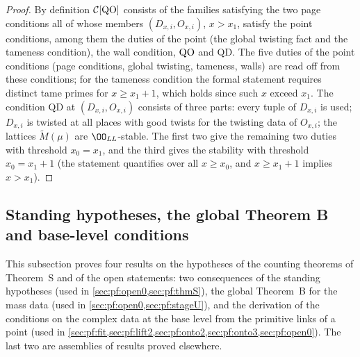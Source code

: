 \begin{proof}
By definition $\mathcal{C}[\mathrm{QO}]$ consists of the families satisfying the two page conditions all of whose members
$(D_{x,i},O_{x,i})$, $x>x_1$, satisfy the point conditions, among them the duties of the point (the global twisting fact
and the tameness condition), the wall condition, $\mathrm{QO}$ and $\mathrm{QD}$. The five duties of the point conditions
(page conditions, global twisting, tameness, walls) are read off from these conditions; for the tameness condition the
formal statement requires distinct tame primes for $x\ge x_1+1$, which holds since such $x$ exceed $x_1$. The condition
$\mathrm{QD}$ at $(D_{x,i},O_{x,i})$ consists of three parts: every tuple of $D_{x,i}$ is used; $D_{x,i}$ is twisted at all
places with good twists for the twisting data of $O_{x,i}$; the lattices $\widetilde M(\mu)$ are $\OO_{\mathit{LL}}$-stable.
The first two give the remaining two duties with threshold $x_0=x_1$, and the third gives the stability with threshold
$x_0=x_1+1$ (the statement quantifies over all $x\ge x_0$, and $x\ge x_1+1$ implies $x>x_1$).
\end{proof}

\subsection{Standing hypotheses, the global Theorem B and base-level conditions}\label{sec:pf:sh-misc:standing}

This subsection proves four results on the hypotheses of the counting theorems of Theorem~S and of the open
statements: two consequences of the standing hypotheses (used in \cref{sec:pf:open0,sec:pf:thmS}), the global
Theorem~B for the mass data (used in \cref{sec:pf:open0,sec:pf:stageU}), and the derivation of the conditions on the
complex data at the base level from the primitive links of a point (used in
\cref{sec:pf:fit,sec:pf:lift2,sec:pf:onto2,sec:pf:onto3,sec:pf:open0}). The last two are assemblies of results proved
elsewhere.

